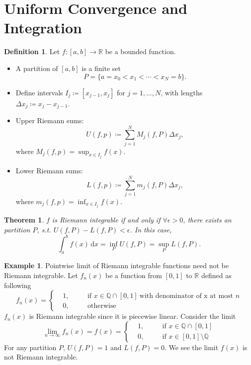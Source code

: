 \documentclass[12pt]{article}
\theoremstyle{plain}
\newtheorem{thm}{Theorem}
\theoremstyle{definition}
\newtheorem*{defn}{Definition}
\newtheorem*{eg}{Example}
\begin{document}
\section*{Uniform Convergence and Integration}
\begin{defn}
    Let $f:[a,b]\rightarrow\mathbb{R}$ be a bounded function.
    \begin{itemize}
        \item
            A partition of $[a,b]$ is a finite set
            $$P=\{a=x_0<x_1<\cdots<x_N=b\}.$$
        \item
            Define intervals $I_j\coloneqq[x_{j-1},x_j]$ for $j=1,\ldots,N$, with
            lengths $\Delta x_j\coloneqq x_j-x_{j-1}$.
        \item
            Upper Riemann sums:
            $$U(f,p)\coloneqq\sum_{j=1}^N M_j(f,P)\Delta x_j,$$
            where $M_j(f,p)=\sup_{x\in I_j}f(x)$.
        \item
            Lower Riemann sums:
            $$L(f,p)\coloneqq\sum_{j=1}^N m_j(f,P)\Delta x_j,$$
            where $m_j(f,p)=\inf_{x\in I_j}f(x)$.
    \end{itemize}
\end{defn}

\begin{thm}
    $f$ is Riemann integrable if and only if $\forall \epsilon>0$, there exists an
    partition $P$, s.t. $U(f,P)-L(f,P)<\epsilon$.
    In this case,
    $$\int_a^b f(x)\,\mathrm{d}x=\inf_P U(f,P)=\sup_P L(f,P).$$
\end{thm}

\begin{eg}
    Pointwise limit of Riemann integrable functions need not be Riemann
    integrable.
    Let $f_n(x)$ be a function from $[0,1]$ to $\mathbb{R}$ defined as following
    $$f_n(x)=\left\{
        \begin{aligned}
        &1,\quad&&\text{if }x\in\mathbb{Q}\cap[0,1]\ \text{with denominator of x
        at most }n\\
        &0,&&\text{otherwise}
        \end{aligned}
    \right.$$
    $f_n(x)$ is Riemann integrable since it is piecewise linear.
    Consider the limit
    $$\lim_{n\rightarrow\infty}f_n(x)=f(x)=\left\{
        \begin{aligned}
        &1,\quad&&\text{if }x\in\mathbb{Q}\cap[0,1]\\
        &0,&&\text{if }x\in[0,1]\setminus\mathbb{Q}
        \end{aligned}
    \right.$$
    For any partition $P$, $U(f,P)=1$ and $L(f,P)=0$. We see the limit $f(x)$ is
    not Riemann integrable.
\end{eg}
\end{document}
